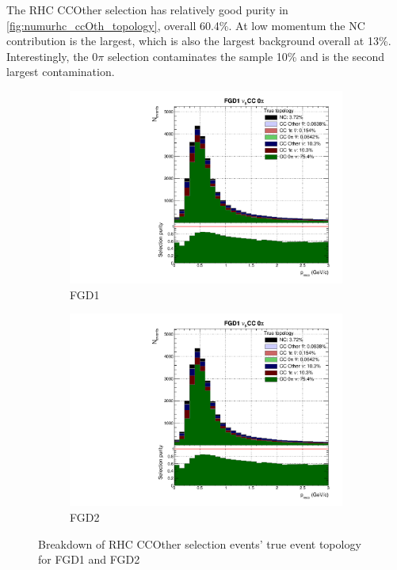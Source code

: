 The \numu RHC CCOther selection has relatively good purity in \autoref{fig:numurhc_ccOth_topology}, overall 60.4\%. At low momentum the NC contribution is the largest, which is also the largest background overall at 13\%. Interestingly, the 0$\pi$ selection contaminates the sample 10\% and is the second largest contamination.
\begin{figure}[h]
	\begin{subfigure}[t]{0.49\textwidth}
		\includegraphics[width=\textwidth,page=29, trim={0mm 0mm 0mm 9mm}, clip]{figures/mach3/2018/Selection/2018_FullNoRedNDmatrix_rebin_verbose_may_diagnostics}
		\caption{FGD1}
	\end{subfigure}
	\begin{subfigure}[t]{0.49\textwidth}
		\includegraphics[width=\textwidth,page=35, trim={0mm 0mm 0mm 9mm}, clip]{figures/mach3/2018/Selection/2018_FullNoRedNDmatrix_rebin_verbose_may_diagnostics}
		\caption{FGD2}
	\end{subfigure}
	\caption{Breakdown of \numu RHC CCOther selection events' true event topology for FGD1 and FGD2 }
	\label{fig:numurhc_ccOth_topology}
\end{figure}

